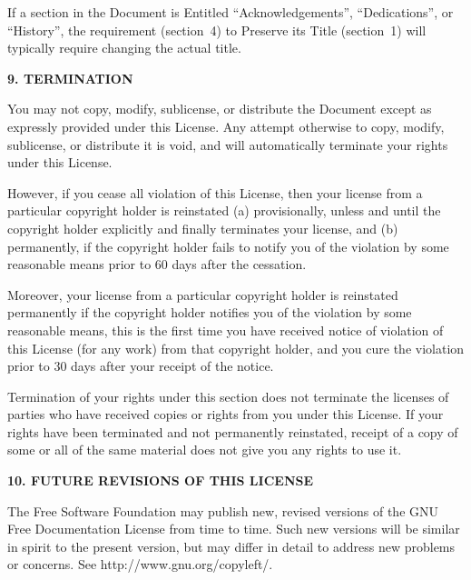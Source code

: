 \documentclass[10pt,a4paper,ngerman,titlepage,tocindentauto]{article}
\begin{document}
\begin{multicols}{3}
{					If a section in the Document is Entitled ``Acknowledgements'',
					``Dedications'', or ``History'', the requirement (section~4) to Preserve
					its Title (section~1) will typically require changing the actual
					title.


					\begin{center}
					{\bf 9. TERMINATION\par}
					\end{center}

					You may not copy, modify, sublicense, or distribute the Document
					except as expressly provided under this License.  Any attempt
					otherwise to copy, modify, sublicense, or distribute it is void, and
					will automatically terminate your rights under this License.

					However, if you cease all violation of this License, then your license
					from a particular copyright holder is reinstated (a) provisionally,
					unless and until the copyright holder explicitly and finally
					terminates your license, and (b) permanently, if the copyright holder
					fails to notify you of the violation by some reasonable means prior to
					60 days after the cessation.

					Moreover, your license from a particular copyright holder is
					reinstated permanently if the copyright holder notifies you of the
					violation by some reasonable means, this is the first time you have
					received notice of violation of this License (for any work) from that
					copyright holder, and you cure the violation prior to 30 days after
					your receipt of the notice.

					Termination of your rights under this section does not terminate the
					licenses of parties who have received copies or rights from you under
					this License.  If your rights have been terminated and not permanently
					reinstated, receipt of a copy of some or all of the same material does
					not give you any rights to use it.


					\begin{center}
					{\bf 10. FUTURE REVISIONS OF THIS LICENSE\par}
					\end{center}

					The Free Software Foundation may publish new, revised versions
					of the GNU Free Documentation License from time to time.  Such new
					versions will be similar in spirit to the present version, but may
					differ in detail to address new problems or concerns.  See
					http://www.gnu.org/copyleft/.

}
\end{multicols}
\end{document}
